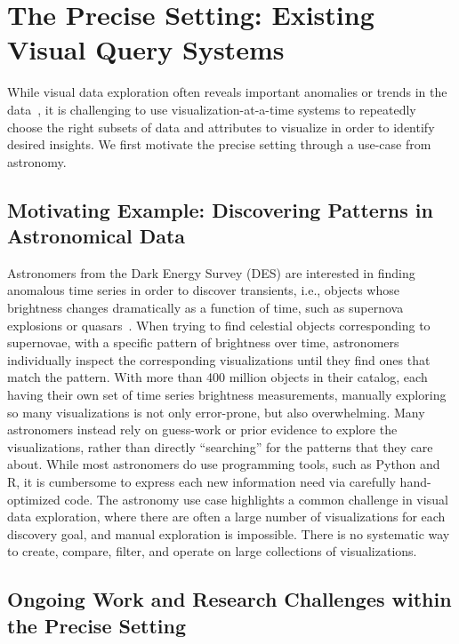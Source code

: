 
\section{The Precise Setting: Existing Visual Query Systems}\label{sec:precise}
While visual data exploration often reveals 
important anomalies or trends 
in the data~\cite{Heer2012,Morton2014}, 
it is challenging to 
use visualization-at-a-time systems to 
repeatedly choose the right subsets of 
data and attributes to visualize
in order to identify desired insights.
We first motivate the precise setting through a use-case from astronomy.

\subsection{Motivating Example: Discovering Patterns in Astronomical Data}
Astronomers from the Dark Energy Survey (DES) 
are interested in finding 
anomalous time series 
in order to discover 
transients, 
i.e., objects whose brightness 
changes dramatically as a function of time, 
such as supernova explosions or quasars~\cite{Drlica-Wagner2017}. 
When trying to find celestial objects 
corresponding to supernovae, 
with a specific pattern of brightness over time, 
astronomers individually inspect the corresponding 
visualizations until 
they find ones that match the pattern. 
With more than 400 million objects in their catalog, 
each having their own set of time series brightness measurements, 
manually exploring so many 
visualizations is not only error-prone, 
but also overwhelming.
Many astronomers instead rely on guess-work 
or prior evidence to explore the visualizations,
rather than directly ``searching'' for the patterns
that they care about. 
While most astronomers do use 
programming tools, such as Python and R,
it is cumbersome to express each new information need
via carefully hand-optimized code. 
The astronomy use case highlights a 
common challenge in visual data exploration,
where there are often a large number of visualizations
for each discovery goal,
and manual exploration is impossible.
There is no systematic way to create, compare, filter,
and operate on large collections of visualizations.

\subsection{Ongoing Work and Research Challenges within the Precise Setting}

